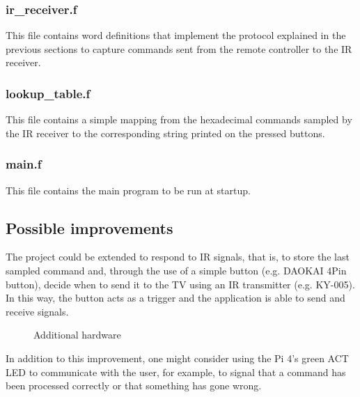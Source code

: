 \documentclass[a4paper, 12pt]{article}
\begin{document}
\subsubsection{ir\_receiver.f}
This file contains word definitions that implement the protocol explained in the previous sections to capture commands sent from the remote controller to the IR receiver.

\subsubsection{lookup\_table.f}
This file contains a simple mapping from the hexadecimal commands sampled by the IR receiver to the corresponding string printed on the pressed buttons.

\subsubsection{main.f}
This file contains the main program to be run at startup.

\subsection{Possible improvements}

The project could be extended to respond to IR signals, that is, to store the last sampled command and, through the use of a simple button (e.g. DAOKAI 4Pin button), decide when to send it to the TV using an IR transmitter (e.g. KY-005). \\
In this way, the button acts as a trigger and the application is able to send and receive signals.

\begin{figure}[h]
    \centering
    \caption{Additional hardware}
\end{figure}

In addition to this improvement, one might consider using the Pi 4's green ACT LED to communicate with the user, for example, to signal that a command has been processed correctly or that something has gone wrong.

\printbibliography
\end{document}
